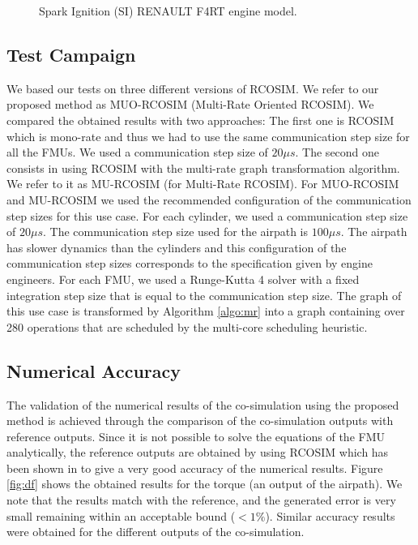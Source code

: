 \begin{figure}[phbt]
\centering

\caption{Spark Ignition (SI) RENAULT F4RT engine model.}
\label{fig:use_case}
\end{figure}

\subsection{Test Campaign}

We based our tests on three different versions of RCOSIM. We refer to our proposed method as MUO-RCOSIM (Multi-Rate Oriented RCOSIM). We compared the obtained results with two approaches: The first one is RCOSIM which is mono-rate and thus we had to use the same communication step size for all the FMUs. We used a communication step size of $20 {\mu}s$. The second one consists in using RCOSIM with the multi-rate graph transformation algorithm. We refer to it as MU-RCOSIM (for Multi-Rate RCOSIM). For MUO-RCOSIM and MU-RCOSIM we used the recommended configuration of the communication step sizes for this use case. For each cylinder, we used a communication step size of $20 {\mu}s$. The communication step size used for the airpath is $100 {\mu}s$. The airpath has slower dynamics than the cylinders and this configuration of the communication step sizes corresponds to the specification given by engine engineers. For each FMU, we used a Runge-Kutta 4 solver with a fixed integration step size that is equal to the communication step size. The graph of this use case is transformed by Algorithm \ref{algo:mr} into a graph containing over 280 operations that are scheduled by the multi-core scheduling heuristic.      

\subsection{Numerical Accuracy}

The validation of the numerical results of the co-simulation using the proposed method is achieved through the comparison of the co-simulation outputs with reference outputs. Since it is not possible to solve the equations of the FMU analytically, the reference outputs are obtained by using RCOSIM which has been shown in \cite{benkhaled:2014} to give a very good accuracy of the numerical results. Figure \ref{fig:df} shows the obtained results for the torque (an output of the airpath). We note that the results match with the reference, and the generated error is very small remaining within an acceptable bound ($< 1\%$). Similar accuracy results were obtained for the different outputs of the co-simulation.

